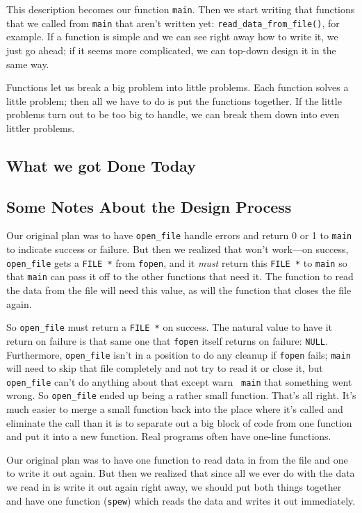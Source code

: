 This description becomes our function {\tt main}.  Then we start writing
that functions that we called from {\tt main} that aren't written yet:
{\tt read\_data\_from\_file()}, for example.  If a function is
simple and we can see right away how to write it, we just go ahead; if
it seems more complicated, we can top-down design it in the same way.

Functions let us break a big problem into little problems.  Each
function solves a little problem; then all we have to do is put the
functions together.  If the little problems turn out to be too big to
handle, we can break them down into even littler problems.

\subsection{What we got Done Today}



\subsection{Some Notes About the Design Process}

Our original plan was to have {\tt open\_file} handle errors and return
0 or 1 to {\tt main} to indicate success or failure.  But then we
realized that won't work---on success, {\tt open\_file} gets a {\tt FILE
*} from {\tt fopen}, and it {\em must}\/ return this {\tt FILE *} to
{\tt main} so that {\tt main} can pass it off to the other functions
that need it.  The function to read the data from the file will need
this value, as will the function that closes the file again.

So {\tt open\_file} must return a {\tt FILE *} on success.  The natural
value to have it return on failure is that same one that {\tt fopen}
itself returns on failure: {\tt NULL}.  Furthermore, {\tt open\_file}
isn't in a position to do any cleanup if {\tt fopen} fails; {\tt main}
will need to skip that file completely and not try to read it or close
it, but {\tt open\_file} can't do anything about that except warn {\tt
main} that something went wrong.  So {\tt open\_file} ended up being a
rather small function.  That's all right.  It's much easier to merge a
small function back into the place where it's called and eliminate the
call than it is to separate out a big block of code from one function
and put it into a new function.  Real programs often have one-line
functions. 

Our original plan was to have one function to read data in from the file
and one to write it out again.  But then we realized that since all we
ever do with the data we read in is write it out again right away, we
should put both things together and have one function ({\tt spew}) which
reads the data and writes it out immediately.  


